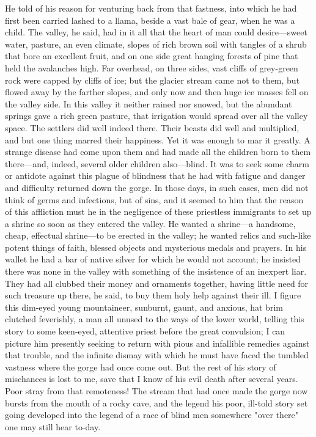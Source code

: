 \documentclass[courier]{sffms}
\begin{document}
He told of his reason for venturing back from that fastness, into
which he had first been carried lashed to a llama, beside a vast bale
of gear, when he was a child. The valley, he said, had in it all that
the heart of man could desire---sweet water, pasture, an even climate,
slopes of rich brown soil with tangles of a shrub that bore an
excellent fruit, and on one side great hanging forests of pine that
held the avalanches high. Far overhead, on three sides, vast cliffs of
grey-green rock were capped by cliffs of ice; but the glacier stream
came not to them, but flowed away by the farther slopes, and only now
and then huge ice masses fell on the valley side. In this valley it
neither rained nor snowed, but the abundant springs gave a rich green
pasture, that irrigation would spread over all the valley space. The
settlers did well indeed there.  Their beasts did well and multiplied,
and but one thing marred their happiness.  Yet it was enough to mar it
greatly. A strange disease had come upon them and had made all the
children born to them there---and, indeed, several older children
also---blind. It was to seek some charm or antidote against this plague
of blindness that he had with fatigue and danger and difficulty
returned down the gorge. In those days, in such cases, men did not
think of germs and infections, but of sins, and it seemed to him that
the reason of this affliction must he in the negligence of these
priestless immigrants to set up a shrine so soon as they entered the
valley. He wanted a shrine---a handsome, cheap, effectual shrine---to be
erected in the valley; he wanted relics and such-like potent things of
faith, blessed objects and mysterious medals and prayers. In his
wallet he had a bar of native silver for which he would not account;
he insisted there was none in the valley with something of the
insistence of an inexpert liar. They had all clubbed their money and
ornaments together, having little need for such treasure up there, he
said, to buy them holy help against their ill. I figure this dim-eyed
young mountaineer, sunburnt, gaunt, and anxious, hat brim clutched
feverishly, a man all unused to the ways of the lower world, telling
this story to some keen-eyed, attentive priest before the great
convulsion; I can picture him presently seeking to return with pious
and infallible remedies against that trouble, and the infinite dismay
with which he must have faced the tumbled vastness where the gorge had
once come out. But the rest of his story of mischances is lost to me,
save that I know of his evil death after several years. Poor stray
from that remoteness! The stream that had once made the gorge now
bursts from the mouth of a rocky cave, and the legend his poor,
ill-told story set going developed into the legend of a race of blind
men somewhere "over there" one may still hear to-day.
\end{document}
